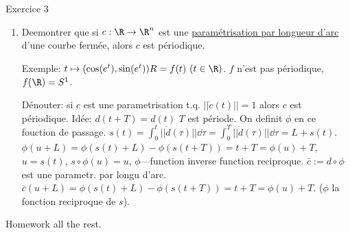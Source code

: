 Exercice 3
\begin{enumerate}
	\item Deemontrer que si $c:\R\rightarrow\R^n$ est une \underline{paramétrisation par longueur d'arc} d'une courbe fermée, alors $c$ est périodique.
	
	Exemple: $t\mapsto (\cos(e^t),\sin(e^t))R=f(t)\ (t\in \R)$. $f$ n'est pas périodique, $f(\R)=S^1$.
	
	Dénouter: si $c$ est une parametrisation t.q. $||\dot c(t)||=1$ alors $c$ est périodique.
	Idée: $d(t+T)=d(t)$ $T$ est période. On definit $\phi$ en ce fouction de passage. $s(t)=\int_0^t||\dot d(\tau)||\dd{\tau}=\int_0^T||\dot d(\tau)||\dd{\tau}=L+s(t)$.
	$\phi(u+L)=\phi(s(t)+L)-\phi(s(t+T))=t+T=\phi(u)+T$, $u=s(t)$, $s\circ\phi(u)=u$, $\phi$---function inverse function reciproque. $\bar c:=d\circ \phi$ est une parametr. par longu d'arc. $\bar c(u+L)=\phi(s(t)+L)-\phi(s(t+T))=t+T=\phi(u)+T$. ($\phi$ la fonction reciproque de $s$).
\end{enumerate}

Homework all the rest.

